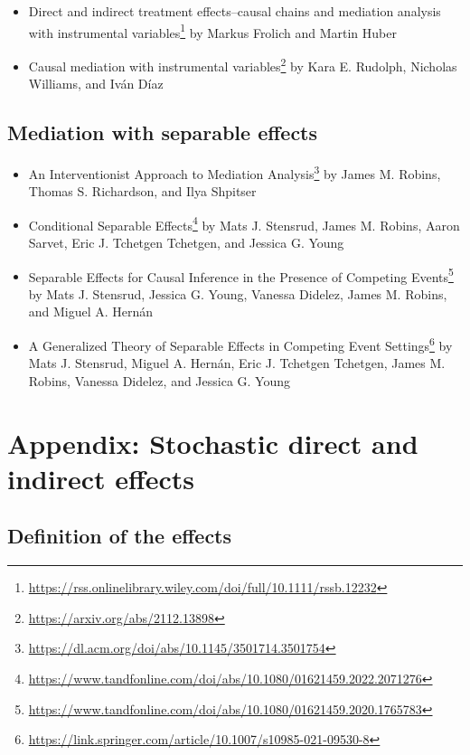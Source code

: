 \documentclass[
  12pt,
]{book}
\providecommand{\tightlist}{%
  \setlength{\itemsep}{0pt}\setlength{\parskip}{0pt}}
\renewcommand{\href}[2]{#2\footnote{\url{#1}}}
\theoremstyle{definition}
\theoremstyle{definition}
\theoremstyle{definition}
\newcommand{\1}{\mathbbm{1}}
\begin{document}
\begin{itemize}
\tightlist
\item
  \href{https://rss.onlinelibrary.wiley.com/doi/full/10.1111/rssb.12232}{Direct and indirect treatment effects--causal chains and mediation analysis
  with instrumental
  variables}
  by Markus Frolich and Martin Huber
\item
  \href{https://arxiv.org/abs/2112.13898}{Causal mediation with instrumental
  variables} by Kara E. Rudolph, Nicholas
  Williams, and Iván Díaz
\end{itemize}

\hypertarget{mediation-with-separable-effects}{%
\section{Mediation with separable effects}\label{mediation-with-separable-effects}}

\begin{itemize}
\tightlist
\item
  \href{https://dl.acm.org/doi/abs/10.1145/3501714.3501754}{An Interventionist Approach to Mediation
  Analysis} by James M.
  Robins, Thomas S. Richardson, and Ilya Shpitser
\item
  \href{https://www.tandfonline.com/doi/abs/10.1080/01621459.2022.2071276}{Conditional Separable
  Effects}
  by Mats J. Stensrud, James M. Robins, Aaron Sarvet, Eric J. Tchetgen
  Tchetgen, and Jessica G. Young
\item
  \href{https://www.tandfonline.com/doi/abs/10.1080/01621459.2020.1765783}{Separable Effects for Causal Inference in the Presence of Competing
  Events} by
  Mats J. Stensrud, Jessica G. Young, Vanessa Didelez, James M. Robins, and
  Miguel A. Hernán
\item
  \href{https://link.springer.com/article/10.1007/s10985-021-09530-8}{A Generalized Theory of Separable Effects in Competing Event
  Settings} by
  Mats J. Stensrud, Miguel A. Hernán, Eric J. Tchetgen Tchetgen, James M.
  Robins, Vanessa Didelez, and Jessica G. Young
\end{itemize}

\hypertarget{stochastic}{%
\chapter{Appendix: Stochastic direct and indirect effects}\label{stochastic}}

\hypertarget{definition-of-the-effects}{%
\section{Definition of the effects}\label{definition-of-the-effects}}
\end{document}
